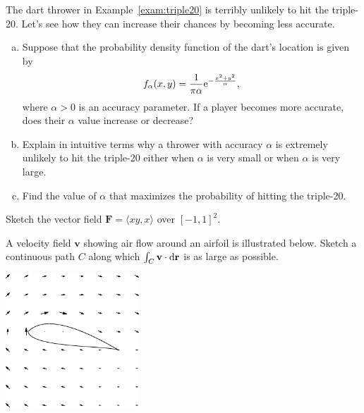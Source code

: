 \documentclass{watsonbook}
\begin{document}
\begin{aexercise}
  The dart thrower in Example~\ref{exam:triple20} is terribly unlikely
  to hit the triple-20. Let's see how they can increase their chances
  by becoming less accurate.

  \begin{enumerate}[(a),topsep=6pt,leftmargin=12pt,itemsep=6pt]
  \item \label{part:whichway} Suppose that the probability density
  function of the dart's location is given by
  \[
    f_\alpha(x,y) = \frac{1}{\pi\alpha} \mathrm{e}^{-\frac{x^2+y^2}{\alpha}},
  \]
  where $\alpha >0$ is an accuracy parameter. If a player becomes more
  accurate, does their $\alpha$ value increase or decrease? 

  \item \label{part:unlikely} Explain in intuitive terms why a
  thrower with accuracy $\alpha$ is extremely unlikely to hit the
  triple-20 either when $\alpha$ is very small or when $\alpha$ is
  very large.

  \item  \label{part:maximizer} Find the value of $\alpha$ that
    maximizes the probability of hitting the triple-20.
  \end{enumerate}
\end{aexercise}


\begin{aexercise}
  Sketch the vector field $\mathbf{F} =\langle xy, x\rangle$ over
  $[-1,1]^2$. 
\end{aexercise}

\begin{aexercise}
  A velocity field $\mathbf{v}$ showing air flow around an airfoil is
  illustrated below. Sketch a continuous path $C$ along which
  $\int_C \mathbf{v} \cdot \mathrm{d}\mathbf{r}$ is as large as possible. 
  \begin{center}
    \includegraphics[width=5cm]{exercisefigures/airfoil.pdf}
  \end{center}
\end{aexercise}
\end{document}
